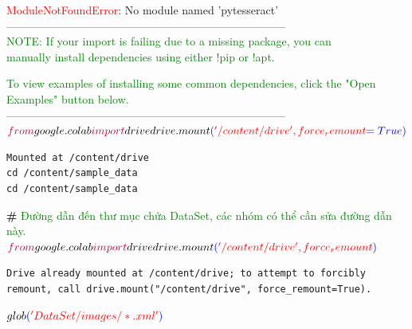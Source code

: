 \documentclass{article}
\begin{document}
\textcolor{red}{ModuleNotFoundError}: No module named 'pytesseract'\\

---------------------------------------------------------------------------\\
\textcolor{green}{NOTE: If your import is failing due to a missing package, you can\\
manually install dependencies using either !pip or !apt.\\}

\textcolor{green}{To view examples of installing some common dependencies, click the
"Open Examples" button below.\\}
---------------------------------------------------------------------------\\
$
\textcolor{purple}{from}google.colab\textcolor{purple}{import} drive\\
drive.mount \textcolor{blue}{(} \textcolor{red}{'/content/drive', force_remount} \textcolor{blue}{ =True) }\\
$
\begin{verbatim}
Mounted at /content/drive
cd /content/sample_data
cd /content/sample_data
\end{verbatim}
\textbf{\#} \textcolor{green}{Đường dẫn đến thư mục chứa DataSet, các nhóm có thể cần sửa đường dẫn này.}\\
$\textcolor{purple}{from}google.colab\textcolor{purple}{import} drive\\
drive.mount \textcolor{blue}{(} \textcolor{red}{'/content/drive', force_remount} \textcolor{blue}{)}\\
$
\begin{verbatim}
Drive already mounted at /content/drive; to attempt to forcibly
remount, call drive.mount("/content/drive", force_remount=True).
\end{verbatim}
$glob\textcolor{blue}{(}\textcolor{red}{'DataSet/images/*.xml'}\textcolor{blue}{)}$
\end{document}
